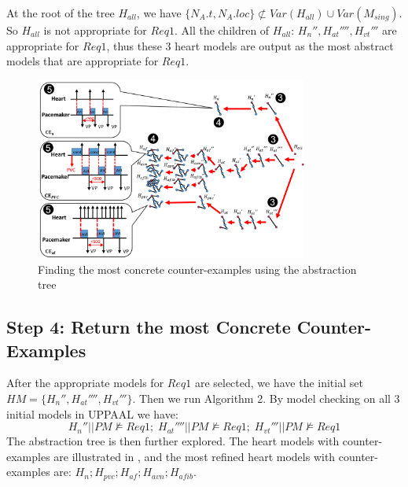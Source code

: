 At the root of the tree $H_{all}$, we have $\{N_A.t,N_A.loc\} \not \subset Var(H_{all})\cup Var(M_{sing})$. 
So $H_{all}$ is not appropriate for $Req1$. 
All the children of $H_{all}$: $H_n'',H_{at}'''',H_{vt}'''$ are appropriate for $Req1$,
thus these 3 heart models are output as the most abstract models that are appropriate for $Req1$.
\begin{figure}[!t]
	\centering
	\includegraphics[width=0.8\textwidth]{figs/abs_rev.pdf}
	\caption{\small Finding the most concrete counter-examples using the abstraction tree}
	\vspace{-10pt}
	\label{fig:CE}
\end{figure}
	\vspace{-10pt}
\subsection*{Step 4: Return the most Concrete Counter-Examples}
After the appropriate models for $Req1$ are selected, we have the initial set
$HM=\{H_n'',H_{at}'''',H_{vt}'''\}$.
Then we run Algorithm 2. By model checking on all 3 initial models in UPPAAL we have: 
$$H_n''||PM\not\models Req1;\; H_{at}''''||PM\not\models Req1;\; H_{vt}'''||PM\not\models Req1$$
The abstraction tree is then further explored. The heart models with counter-examples are illustrated in , and the most refined heart models with counter-examples are: $H_{n};H_{pvc};H_{af};H_{avn};H_{afib}$.

